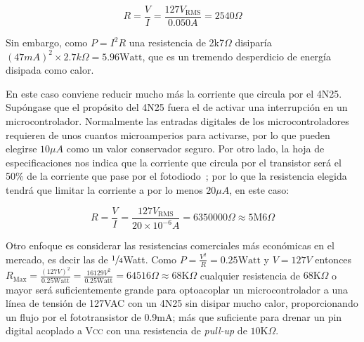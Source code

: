 \begin{equation*}
R=\frac{V}{I}=\frac{127V_\text{RMS}}{0.050A}
= 2540\Omega
\end{equation*}

Sin embargo, como $P=I^2R$ una resistencia de 2k7$\Omega$ disiparía ${\left(47mA\right)}^{2}\times 2.7k\Omega = 5.96\text{Watt}$, que es un tremendo desperdicio de energía disipada como calor.

En este caso conviene reducir mucho más la corriente que circula por el 4N25.
Supóngase que el propósito del 4N25 fuera el de activar una interrupción en un microcontrolador.
Normalmente las entradas digitales de los microcontroladores requieren de unos cuantos microamperios para activarse, por lo que pueden elegirse $10\mu A$ como un valor conservador seguro.
Por otro lado, la hoja de especificaciones nos indica que la corriente que circula por el transistor será el 50\% de la corriente que pase por el fotodiodo~; por lo que la resistencia elegida tendrá que limitar la corriente a por lo menos $20\mu A$, en este caso:

\begin{equation*}
R=\frac{V}{I}=\frac{127V_\text{RMS}}{20\times{10}^{-6}A}
= 6350000\Omega \approx 5\text{M}6\Omega
\end{equation*}

Otro enfoque es considerar las resistencias comerciales más económicas en el mercado, es decir las de $\sfrac{1}{4}$Watt.
Como $P=\frac{V^2}{R}=0.25\text{Watt}$ y $V=127V$ entonces
\(
	R_\text{Max}
		=\frac{{\left(127V\right)}^2}{0.25\text{Watt}}
		=\frac{16129{V}^2}{0.25\text{Watt}}
		=64516\Omega \approx 68\text{K}\Omega
\)
cualquier resistencia de $68\text{K}\Omega$ o mayor será suficientemente grande para optoacoplar un microcontrolador a una línea de tensión de 127VAC con un 4N25 sin disipar mucho calor, proporcionando un flujo por el fototransistor de 0.9mA; más que suficiente para drenar un pin digital acoplado a \textsc{Vcc} con una resistencia de \emph{pull-up} de $10\text{K}\Omega$.
